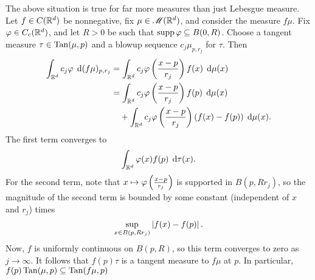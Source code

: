 The above situation is true for far more measures than just Lebesgue measure. Let $f \in C(\mathbb{R}^d)$ be nonnegative, fix $\mu \in \mathscr{M}(\mathbb{R}^d)$, and consider the measure $f\mu$. Fix $\varphi \in C_c(\mathbb{R}^d)$, and let $R > 0$ be such that $\operatorname{supp}{\varphi} \subseteq B(0,R)$. Choose a tangent measure $\tau \in \operatorname{Tan}(\mu,p)$ and a blowup sequence $c_j \mu_{p,r_j}$ for $\tau$. Then 
\begin{equation} \begin{aligned}
    \int_{\mathbb{R}^d} c_j \varphi \;\operatorname{d}\!{(}f\mu)_{p,r_j} &= \int_{\mathbb{R}^d} c_j \varphi\left( {\frac{x-p}{r_j}} \right) f(x) \; \operatorname{d}\!{\mu}(x) \\
                                                &= \int_{\mathbb{R}^d} c_j \varphi\left( {\frac{x-p}{r_j}} \right) f(p) \; \operatorname{d}\!{\mu}(x) \\
                                                &\quad + \int_{\mathbb{R}^d} c_j \varphi\left( {\frac{x-p}{r_j}} \right) ( f(x) - f(p) ) \; \operatorname{d}\!{\mu}(x).
\end{aligned} \end{equation}
The first term converges to
\begin{equation}
    \int_{\mathbb{R}^d} \varphi(x) f(p) \; \operatorname{d}\!{\tau}(x).
\end{equation}
For the second term, note that $x \mapsto \varphi\left( {\frac{x-p}{r_j}} \right)$ is supported in $B(p, Rr_j)$, so the magnitude of the second term is bounded by some constant (independent of $x$ and $r_j$) times
\begin{equation}
    \sup_{x \in B(p,Rr_j)} \left\vert {f(x) - f(p)} \right\vert.
\end{equation}
Now, $f$ is uniformly continuous on $B(p,R)$, so this term converges to zero as $j \to \infty$. It follows that $f(p) \tau$ is a tangent measure to $f\mu$ at $p$. In particular, $f(p)\operatorname{Tan}(\mu,p) \subseteq \operatorname{Tan}(f\mu,p)$

